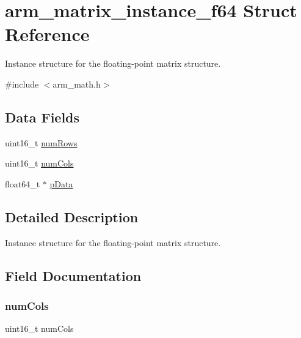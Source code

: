 \hypertarget{structarm__matrix__instance__f64}{}\section{arm\+\_\+matrix\+\_\+instance\+\_\+f64 Struct Reference}
\label{structarm__matrix__instance__f64}


Instance structure for the floating-\/point matrix structure.  




{\ttfamily \#include $<$arm\+\_\+math.\+h$>$}

\subsection*{Data Fields}
\begin{DoxyCompactItemize}
\item 
uint16\+\_\+t \mbox{\hyperlink{structarm__matrix__instance__f64_a1bcf80ccdc2acc29198f1592ae300390}{num\+Rows}}
\item 
uint16\+\_\+t \mbox{\hyperlink{structarm__matrix__instance__f64_a4bb5ec0d13eb4c9cf887aa8366a44117}{num\+Cols}}
\item 
float64\+\_\+t $\ast$ \mbox{\hyperlink{structarm__matrix__instance__f64_aa7a4c9839c31e933360ef3a3167b9877}{p\+Data}}
\end{DoxyCompactItemize}


\subsection{Detailed Description}
Instance structure for the floating-\/point matrix structure. 

\subsection{Field Documentation}
\mbox{\label{structarm__matrix__instance__f64_a4bb5ec0d13eb4c9cf887aa8366a44117}} 
\subsubsection{\texorpdfstring{numCols}{numCols}}
{\footnotesize\ttfamily uint16\+\_\+t num\+Cols}


